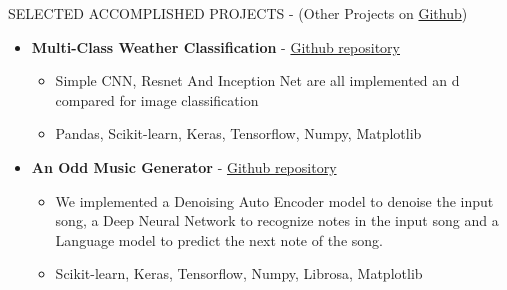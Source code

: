 \documentclass[]{CV}
\begin{document}
\begin{section}{SELECTED ACCOMPLISHED PROJECTS { - (Other Projects on \href{https://github.com/amirkasaei}{Github})}}
\begin{itemize}
    
     \item \textbf{Multi-Class Weather Classification} - \href{https://github.com/amirkasaei/Multi-Class-Weather-Classification}{Github repository}
   \begin{itemize}
        \item Simple CNN, Resnet And Inception Net are all implemented an d compared for image classification
        \item  Pandas, Scikit-learn, Keras, Tensorflow, Numpy, Matplotlib
    \end{itemize}
    
\pagebreak  
\item \textbf{An Odd Music Generator} - \href{https://github.com/amirkasaei/An-Odd-Music-Generator}{Github repository}
   \begin{itemize}
        \item We implemented a Denoising Auto Encoder model to denoise the input song, a Deep Neural Network to recognize notes in the input song and a Language model to predict the next note of  the song.\vspace{-2mm}
        \item Scikit-learn, Keras, Tensorflow, Numpy, Librosa, Matplotlib
    \end{itemize} 
    
    


\end{itemize}
\end{section}
\end{document}
